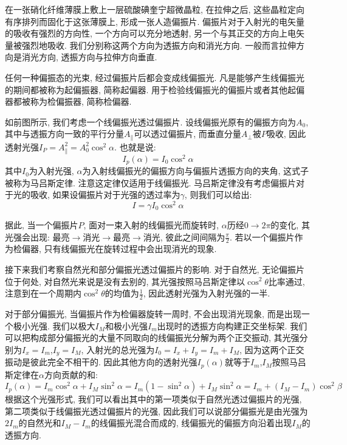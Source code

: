 在一张硝化纤维薄膜上敷上一层硫酸碘奎宁超微晶粒, 在拉伸之后, 这些晶粒定向有序排列而固化于这张薄膜上, 形成一张人造偏振片. 偏振片对于入射光的电矢量的吸收有强烈的方向性, 一个方向可以充分地透射, 另一个与其正交的方向上电矢量被强烈地吸收. 我们分别称这两个方向为透振方向和消光方向. 一般而言拉伸方向是消光方向, 透振方向与拉伸方向垂直.

任何一种偏振态的光束, 经过偏振片后都会变成线偏振光. 凡是能够产生线偏振光的期间都被称为起偏振器, 简称起偏器. 用于检验线偏振光的偏振片或者其他起偏器都被称为检偏振器, 简称检偏器.

如前图所示, 我们考虑一个线偏振光透过偏振片. 设线偏振光原有的偏振方向为$A_0$, 其中与透振方向一致的平行分量$A_{\parallel}$可以透过偏振片, 而垂直分量$A_{\perp}$被$P$吸收, 因此透射光强$I_P=A_{\parallel}^2 = A_0^2\cos^2\alpha$. 也就是说:
\[
I_p(\alpha) = I_0\cos^2\alpha
\]
其中$I_0$为入射光强, $\alpha$为入射线偏振光的偏振方向与偏振片透振方向的夹角, 这式子被称为马吕斯定律. 注意这定律仅适用于线偏振光. 马吕斯定律没有考虑偏振片对于光的吸收, 如果设偏振片对于光强的透过率为$\gamma$, 则我们可以给出:
\[
I = \gamma I_0 \cos^2 \alpha
\]

据此, 当一个偏振片$P$, 面对一束入射的线偏振光而旋转时, $\alpha$历经$0 \to 2\pi$的变化, 其光强会出现: 最亮$\to$消光$\to$最亮$\to$消光, 彼此之间间隔为$\frac{\pi}{2}$. 若以一个偏振片作为检偏器, 只有线偏振光在旋转过程中会出现消光的现象.

接下来我们考察自然光和部分偏振光透过偏振片的影响. 对于自然光, 无论偏振片位于何处, 对自然光来说是没有去别的, 其光强按照马吕斯定律以$\cos^2\theta$比率通过, 注意到在一个周期内$\cos^2\theta$的均值为$\frac{1}{2}$, 因此透射光强为入射光强的一半.


对于部分偏振光, 当偏振片作为检偏器旋转一周时, 不会出现消光现象, 而是出现一个极小光强. 我们以极大$I_M$和极小光强$I_m$出现时的透振方向构建正交坐标架. 我们可以把构成部分偏振光的大量不同取向的线偏振光分解为两个正交振动, 其光强分别为$I_x=I_m$,$I_y=I_M$, 入射光的总光强为$I_0=I_x+I_y=I_m+I_M$, 因为这两个正交振动是彼此完全不相干的. 因此其他方向的透射光强$I_p(\alpha)$就等于$I_m$,$I_M$按照马吕斯定律在$\alpha$方向贡献的和:
\[
I_p(\alpha) = I_m\cos^2\alpha+I_M\sin^2\alpha= I_m(1-\sin^2\alpha)+I_M\sin^2\alpha = I_m+(I_M-I_m)\cos^2\beta
\]
根据这个光强形式, 我们可以看出其中的第一项类似于自然光透过偏振片的光强, 第二项类似于线偏振光透过偏振片的光强, 因此我们可以说部分偏振光是由光强为$2I_m$的自然光和$I_M-I_m$的线偏振光混合而成的, 线偏振光的偏振方向沿着出现$I_M$的透振方向.

